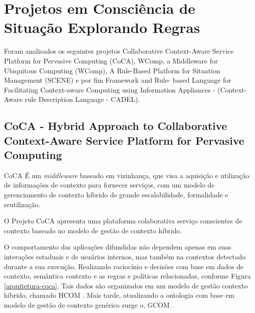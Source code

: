 \documentclass[12pt,a4paper,compsoc]{IEEEtran}
\begin{document}
\section{Projetos em Consciência de Situação Explorando Regras}

  Foram analisados os seguintes projetos Collaborative Context-Aware Service Platform for Pervasive
  Computing (CoCA), WComp, a Middleware for Ubiquitous Computing (WComp), A Rule-Based Platform for
  Situation Management (SCENE) e por fim Framework and Rule- based Language for Facilitating 
  Context-aware Computing using Information Appliances - (Context-Aware rule Description Language -
  CADEL).

\subsection{CoCA - Hybrid Approach to Collaborative Context-Aware Service Platform for Pervasive
 Computing}

  CoCA É um \textit{middleware} baseado em vizinhança, que visa a aquisição e utilização de
  informações de contexto para fornecer serviços, com um modelo de gerenciamento de contexto híbrido
  de grande escalabilidade, formalidade e reutilização.
  
  O Projeto CoCA \cite{ejigu2008hybrid} apresenta uma plataforma colaborativa serviço conscientes
  de contexto baseado no modelo de gestão de contexto híbrido.
  
  O comportamento das aplicações difundidas não dependem apenas em suas interações estaduais e de
  usuários internos, mas também na contextos detectado durante a sua execução. Realizando 
  raciocínio e decisões com base em dados de contexto, semântica contexto e as regras e políticas
  relacionadas, conforme Figura \ref{arquitetura-coca}. Tais dados são organizados em um modelo de
  gestão contexto híbrido, chamado HCOM \cite{ejigu2008hybrid}. Mais tarde, atualizando a ontologia
  com base em modelo de gestão de contexto genérico surge o, GCOM \cite{ejigu2008hybrid}.
\end{document}
